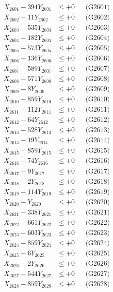\documentclass[a4paper,10pt]{article}
\begin{document}
{\begin{align}
\allowbreak
X_{2601} - 394Y_{2601} &\leq +0 && \text{(G2601)} \\
X_{2602} - 11Y_{2602} &\leq +0 && \text{(G2602)} \\
X_{2603} - 535Y_{2603} &\leq +0 && \text{(G2603)} \\
X_{2604} - 182Y_{2604} &\leq +0 && \text{(G2604)} \\
X_{2605} - 573Y_{2605} &\leq +0 && \text{(G2605)} \\
X_{2606} - 136Y_{2606} &\leq +0 && \text{(G2606)} \\
X_{2607} - 589Y_{2607} &\leq +0 && \text{(G2607)} \\
X_{2608} - 571Y_{2608} &\leq +0 && \text{(G2608)} \\
X_{2609} - 8Y_{2609} &\leq +0 && \text{(G2609)} \\
X_{2610} - 859Y_{2610} &\leq +0 && \text{(G2610)} \\
\allowbreak
X_{2611} - 112Y_{2611} &\leq +0 && \text{(G2611)} \\
X_{2612} - 64Y_{2612} &\leq +0 && \text{(G2612)} \\
X_{2613} - 528Y_{2613} &\leq +0 && \text{(G2613)} \\
X_{2614} - 19Y_{2614} &\leq +0 && \text{(G2614)} \\
X_{2615} - 859Y_{2615} &\leq +0 && \text{(G2615)} \\
X_{2616} - 74Y_{2616} &\leq +0 && \text{(G2616)} \\
X_{2617} - 9Y_{2617} &\leq +0 && \text{(G2617)} \\
X_{2618} - 2Y_{2618} &\leq +0 && \text{(G2618)} \\
X_{2619} - 114Y_{2619} &\leq +0 && \text{(G2619)} \\
X_{2620} - Y_{2620} &\leq +0 && \text{(G2620)} \\
\allowbreak
X_{2621} - 338Y_{2621} &\leq +0 && \text{(G2621)} \\
X_{2622} - 661Y_{2622} &\leq +0 && \text{(G2622)} \\
X_{2623} - 603Y_{2623} &\leq +0 && \text{(G2623)} \\
X_{2624} - 859Y_{2624} &\leq +0 && \text{(G2624)} \\
X_{2625} - 6Y_{2625} &\leq +0 && \text{(G2625)} \\
X_{2626} - 2Y_{2626} &\leq +0 && \text{(G2626)} \\
X_{2627} - 544Y_{2627} &\leq +0 && \text{(G2627)} \\
X_{2628} - 859Y_{2628} &\leq +0 && \text{(G2628)} \\

\end{align}}
\end{document}
